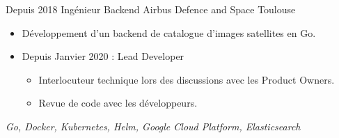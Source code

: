 \cventry
    {Depuis 2018}
    {Ingénieur Backend}
    {}
    {Airbus Defence and Space}
    {Toulouse}
    {
        \begin{itemize}
            \item Développement d'un backend de catalogue d'images satellites en Go.
            \item Depuis Janvier 2020 : Lead Developer
            \begin{itemize}
                \item Interlocuteur technique lors des discussions avec les Product Owners.
                \item Revue de code avec les développeurs.
            \end{itemize}
        \end{itemize}
        \textit{Go, Docker, Kubernetes, Helm, Google Cloud Platform, Elasticsearch}
    }
\vspace*{0.2cm}